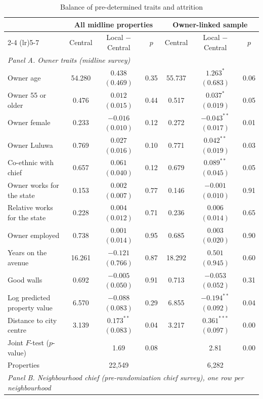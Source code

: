 \begin{table}[!htbp]\centering\scriptsize
\caption{Balance of pre-determined traits and attrition}\label{tab:balance}
\begin{threeparttable}
\begin{tabular}{lcccccc}
\toprule
 & \multicolumn{3}{c}{All midline properties} & \multicolumn{3}{c}{Owner-linked sample} \\
\cmidrule(lr){2-4} \cmidrule(lr){5-7}
 & Central & Local $-$ Central & $p$ & Central & Local $-$ Central & $p$ \\
\midrule
\multicolumn{7}{l}{\textit{Panel A. Owner traits (midline survey)}} \\
Owner age & 54.280 & $0.438$ $(0.469)$ & 0.35 & 55.737 & $1.263^{*}$ $(0.683)$ & 0.06 \\
Owner 55 or older & 0.476 & $0.012$ $(0.015)$ & 0.44 & 0.517 & $0.037^{*}$ $(0.019)$ & 0.05 \\
Owner female & 0.233 & $-0.016$ $(0.010)$ & 0.12 & 0.272 & $-0.043^{**}$ $(0.017)$ & 0.01 \\
Owner Luluwa & 0.769 & $0.027$ $(0.016)$ & 0.10 & 0.771 & $0.042^{**}$ $(0.019)$ & 0.03 \\
Co-ethnic with chief & 0.657 & $0.061$ $(0.040)$ & 0.12 & 0.679 & $0.089^{**}$ $(0.045)$ & 0.05 \\
Owner works for the state & 0.153 & $0.002$ $(0.007)$ & 0.77 & 0.146 & $-0.001$ $(0.010)$ & 0.91 \\
Relative works for the state & 0.228 & $0.004$ $(0.012)$ & 0.71 & 0.236 & $0.006$ $(0.014)$ & 0.65 \\
Owner employed & 0.738 & $0.001$ $(0.014)$ & 0.95 & 0.685 & $0.003$ $(0.020)$ & 0.90 \\
Years on the avenue & 16.261 & $-0.121$ $(0.766)$ & 0.87 & 18.292 & $0.501$ $(0.945)$ & 0.60 \\
Good walls & 0.692 & $-0.005$ $(0.050)$ & 0.91 & 0.713 & $-0.053$ $(0.052)$ & 0.31 \\
Log predicted property value & 6.570 & $-0.088$ $(0.083)$ & 0.29 & 6.855 & $-0.194^{**}$ $(0.092)$ & 0.04 \\
Distance to city centre & 3.139 & $0.173^{**}$ $(0.083)$ & 0.04 & 3.217 & $0.361^{***}$ $(0.097)$ & 0.00 \\
Joint $F$-test ($p$-value) &  & 1.69 & 0.08 &  & 2.81 & 0.00 \\
Properties &  & 22,549 &  &  & 6,282 &  \\
\midrule
\multicolumn{7}{l}{\textit{Panel B. Neighbourhood chief (pre-randomization chief survey), one row per neighbourhood}} \\

\end{tabular}
\end{threeparttable}
\end{table}
